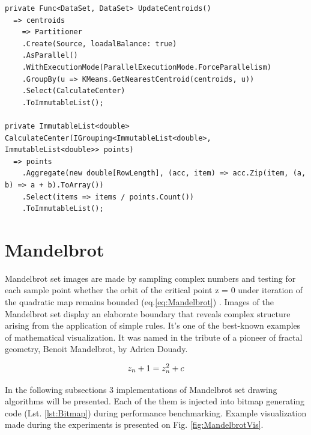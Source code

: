 \begin{lstlisting}[language={[sharp]c}, style=sharpcstyle, caption={Parallel k-means algorithm with partitioner}, label={lst:PartParKMeans}]
private Func<DataSet, DataSet> UpdateCentroids()
  => centroids 
    => Partitioner
    .Create(Source, loadalBalance: true)
    .AsParallel()
    .WithExecutionMode(ParallelExecutionMode.ForceParallelism)
    .GroupBy(u => KMeans.GetNearestCentroid(centroids, u))
    .Select(CalculateCenter)
    .ToImmutableList();

private ImmutableList<double> CalculateCenter(IGrouping<ImmutableList<double>, ImmutableList<double>> points) 
  => points
    .Aggregate(new double[RowLength], (acc, item) => acc.Zip(item, (a, b) => a + b).ToArray())
    .Select(items => items / points.Count())
    .ToImmutableList();
\end{lstlisting}

\clearpage
\section{Mandelbrot}

Mandelbrot set images are made by sampling complex numbers and testing for each sample point whether the orbit of the critical point z = 0 under iteration of the quadratic map remains bounded (eq.\ref{eq:Mandelbrot}) \cite{MandelbrotExplorer}. Images of the Mandelbrot set display an elaborate boundary that reveals complex structure arising from the application of simple rules. It's one of the best-known examples of mathematical visualization. It was named in the tribute of a pioneer of fractal geometry, Benoit Mandelbrot, by Adrien Douady. \cite{Douady}

\begin{equation}
\centering 
z_n + 1 = z_n^2 + c
\label{eq:Mandelbrot}
\end{equation}

In the following subsections 3 implementations of Mandelbrot set drawing algorithms will be presented. Each of the them is injected into bitmap generating code (Lst. \ref{lst:Bitmap}) during performance benchmarking. Example visualization made during the experiments is presented on Fig. \ref{fig:MandelbrotVis}.

